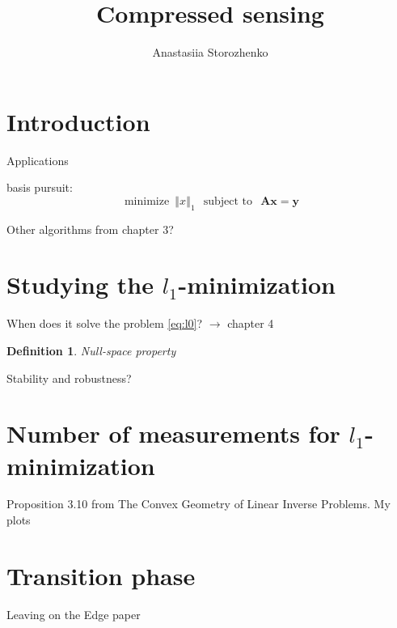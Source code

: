 \documentclass[12pt]{article}
\title{Compressed sensing}
\author{Anastasiia Storozhenko}
\newtheorem{definition}{Definition}[section]
\newcommand{\norm}[1]{\left\Vert#1\right\Vert}
\newcommand{\op}[1]{\operatorname{#1}}
\begin{document}
\maketitle

%

\section{Introduction}

Applications







basis pursuit:
\begin{equation}
    \op{minimize} \ \norm{x}_1 \ \ \op{subject\ to} \ \ \mathbf{Ax=y}
\end{equation}

Other algorithms from chapter 3?

\section{Studying the $l_1$-minimization}

When does it solve the problem \ref{eq:l0}? $\xrightarrow{}$ chapter 4

\begin{definition}
    Null-space property
\end{definition}

Stability and robustness?

\section{Number of measurements for $l_1$-minimization}

Proposition 3.10 from The Convex Geometry of Linear Inverse Problems.
My plots

\section{Transition phase}

Leaving on the Edge paper

\newpage
\end{document}
